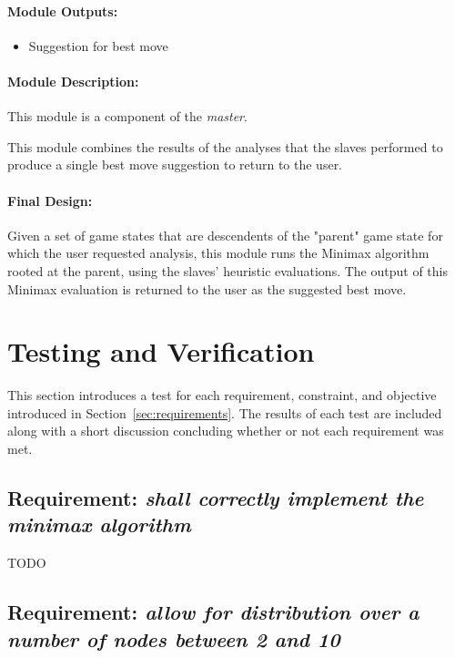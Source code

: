 \documentclass[pdftex,12pt,a4paper]{article}
\begin{document}
\paragraph{Module Outputs:}
\begin{itemize}
\item Suggestion for best move
\end{itemize}

\paragraph{Module Description:\\}
This module is a component of the \emph{master}.

This module combines the results of the analyses that the slaves performed to produce a single best move suggestion to return to the user.

\paragraph{Final Design:\\}
Given a set of game states that are descendents of the "parent" game state for which the user requested analysis, this module runs the Minimax algorithm rooted at the parent, using the slaves' heuristic evaluations. The output of this Minimax evaluation is returned to the user as the suggested best move.


%
%
\section{Testing and Verification}

This section introduces a test for each requirement, constraint, and objective introduced in Section~\ref{sec:requirements}. The results of each test are included along with a short discussion concluding whether or not each requirement was met.


\subsection{\textbf{Requirement:} \emph{shall correctly implement the minimax algorithm}}

TODO

\subsection{\textbf{Requirement:} \emph{allow for distribution over a number of nodes between 2 and 10}}
\end{document}
